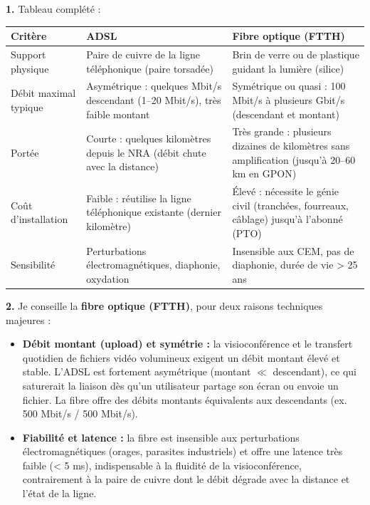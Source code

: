 \documentclass[11pt]{article}
\begin{document}
\begin{corrige}
\textbf{1.} Tableau complété :
\begin{center}
\begin{tabularx}{\linewidth}{|l|X|X|}
\hline
\rowcolor{popblueL} \textbf{Critère} & \textbf{ADSL} & \textbf{Fibre optique (FTTH)} \\
\hline
Support physique & Paire de cuivre de la ligne téléphonique (paire torsadée) & Brin de verre ou de plastique guidant la lumière (silice) \\
\hline
Débit maximal typique & Asymétrique : quelques Mbit/s descendant (1--20 Mbit/s), très faible montant & Symétrique ou quasi : 100 Mbit/s à plusieurs Gbit/s (descendant et montant) \\
\hline
Portée & Courte : quelques kilomètres depuis le NRA (débit chute avec la distance) & Très grande : plusieurs dizaines de kilomètres sans amplification (jusqu'à 20--60 km en GPON) \\
\hline
Coût d'installation & Faible : réutilise la ligne téléphonique existante (dernier kilomètre) & Élevé : nécessite le génie civil (tranchées, fourreaux, câblage) jusqu'à l'abonné (PTO) \\
\hline
Sensibilité & Perturbations électromagnétiques, diaphonie, oxydation & Insensible aux CEM, pas de diaphonie, durée de vie > 25 ans \\
\hline
\end{tabularx}
\end{center}
\textbf{2.} Je conseille la \textbf{fibre optique (FTTH)}, pour deux raisons techniques majeures :
\begin{itemize}
    \item \textbf{Débit montant (upload) et symétrie :} la visioconférence et le transfert quotidien de fichiers vidéo volumineux exigent un débit montant élevé et stable. L'ADSL est fortement asymétrique (montant $\ll$ descendant), ce qui saturerait la liaison dès qu'un utilisateur partage son écran ou envoie un fichier. La fibre offre des débits montants équivalents aux descendants (ex. 500 Mbit/s / 500 Mbit/s).
    \item \textbf{Fiabilité et latence :} la fibre est insensible aux perturbations électromagnétiques (orages, parasites industriels) et offre une latence très faible (< 5 ms), indispensable à la fluidité de la visioconférence, contrairement à la paire de cuivre dont le débit dégrade avec la distance et l'état de la ligne.
\end{itemize}
\end{corrige}
\end{document}

